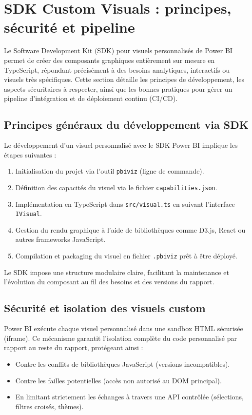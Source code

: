 
\section{SDK Custom Visuals : principes, sécurité et pipeline}
\label{sec:sdk-custom-visuals}

Le Software Development Kit (SDK) pour visuels personnalisés de Power BI permet de créer des composants graphiques entièrement sur mesure en TypeScript, répondant précisément à des besoins analytiques, interactifs ou visuels très spécifiques. Cette section détaille les principes de développement, les aspects sécuritaires à respecter, ainsi que les bonnes pratiques pour gérer un pipeline d’intégration et de déploiement continu (CI/CD).

\subsection{Principes généraux du développement via SDK}

Le développement d’un visuel personnalisé avec le SDK Power BI implique les étapes suivantes :
\begin{enumerate}
  \item Initialisation du projet via l’outil \texttt{pbiviz} (ligne de commande).
  \item Définition des capacités du visuel via le fichier \texttt{capabilities.json}.
  \item Implémentation en TypeScript dans \texttt{src/visual.ts} en suivant l'interface \texttt{IVisual}.
  \item Gestion du rendu graphique à l’aide de bibliothèques comme D3.js, React ou autres frameworks JavaScript.
  \item Compilation et packaging du visuel en fichier \texttt{.pbiviz} prêt à être déployé.
\end{enumerate}

Le SDK impose une structure modulaire claire, facilitant la maintenance et l’évolution du composant au fil des besoins et des versions du rapport.

\subsection{Sécurité et isolation des visuels custom}

Power BI exécute chaque visuel personnalisé dans une sandbox HTML sécurisée (iframe). Ce mécanisme garantit l’isolation complète du code personnalisé par rapport au reste du rapport, protégeant ainsi :
\begin{itemize}
  \item Contre les conflits de bibliothèques JavaScript (versions incompatibles).
  \item Contre les failles potentielles (accès non autorisé au DOM principal).
  \item En limitant strictement les échanges à travers une API contrôlée (sélections, filtres croisés, thèmes).
\end{itemize}

